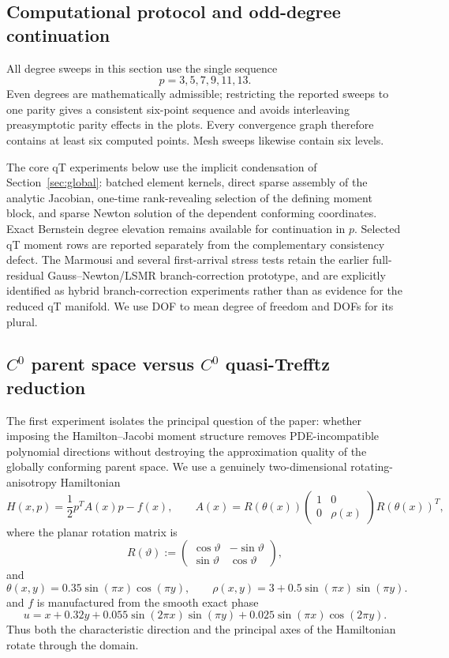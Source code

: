 \documentclass[preprint,12pt]{elsarticle}
\begin{document}
\subsection{Computational protocol and odd-degree continuation}
All degree sweeps in this section use the single sequence
\begin{equation}\label{eq:odddegrees}
  p=3,5,7,9,11,13.
\end{equation}
Even degrees are mathematically admissible; restricting the reported sweeps to one parity gives a consistent six-point sequence and avoids interleaving preasymptotic parity effects in the plots.  Every convergence graph therefore contains at least six computed points.  Mesh sweeps likewise contain six levels.

The core qT experiments below use the implicit condensation of Section~\ref{sec:global}: batched element kernels, direct sparse assembly of the analytic Jacobian, one-time rank-revealing selection of the defining moment block, and sparse Newton solution of the dependent conforming coordinates.  Exact Bernstein degree elevation remains available for continuation in $p$.  Selected qT moment rows are reported separately from the complementary consistency defect.  The Marmousi and several first-arrival stress tests retain the earlier full-residual Gauss--Newton/LSMR branch-correction prototype, and are explicitly identified as hybrid branch-correction experiments rather than as evidence for the reduced qT manifold.  We use DOF to mean degree of freedom and DOFs for its plural.


\subsection{$C^0$ parent space versus $C^0$ quasi-Trefftz reduction}\label{sec:c0qtcompare}
The first experiment isolates the principal question of the paper: whether imposing the Hamilton--Jacobi moment structure removes PDE-incompatible polynomial directions without destroying the approximation quality of the globally conforming parent space.  We use a genuinely two-dimensional rotating-anisotropy Hamiltonian
\begin{equation}\label{eq:rotanis}
 H(x,p)=\frac12 p^T A(x)p-f(x),\qquad
 A(x)=R(\theta(x))
 \begin{pmatrix}1&0\\0&\rho(x)\end{pmatrix}R(\theta(x))^T,
\end{equation}
where the planar rotation matrix is
\[
 R(\vartheta):=
 \begin{pmatrix}
  \cos\vartheta & -\sin\vartheta\\
  \sin\vartheta & \cos\vartheta
 \end{pmatrix},
\]
and
\[
 \theta(x,y)=0.35\sin(\pi x)\cos(\pi y),\qquad
 \rho(x,y)=3+0.5\sin(\pi x)\sin(\pi y).
\]
and $f$ is manufactured from the smooth exact phase
\begin{equation}\label{eq:rotanisphase}
 u=x+0.32y+0.055\sin(2\pi x)\sin(\pi y)
   +0.025\sin(\pi x)\cos(2\pi y).
\end{equation}
Thus both the characteristic direction and the principal axes of the Hamiltonian rotate through the domain.
\end{document}
